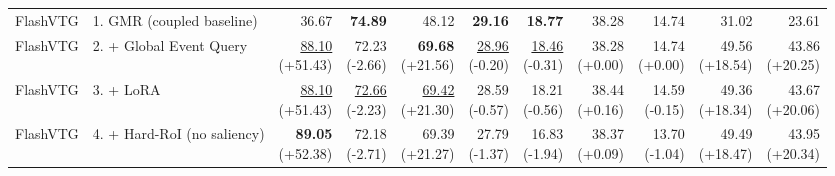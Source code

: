 \documentclass{article}
\begin{document}
{\begin{tabular}{llrrrrrrrrr}
\midrule
FlashVTG & 1. GMR (coupled baseline) & 36.67 & \textbf{74.89} & 48.12 & \textbf{29.16} & \textbf{18.77} & 38.28 & 14.74 & 31.02 & 23.61 \\
FlashVTG & 2. + Global Event Query & \shortstack{\underline{88.10} \\ {\scriptsize (+51.43)}} & \shortstack{72.23 \\ {\scriptsize (-2.66)}} & \shortstack{\textbf{69.68} \\ {\scriptsize (+21.56)}} & \shortstack{\underline{28.96} \\ {\scriptsize (-0.20)}} & \shortstack{\underline{18.46} \\ {\scriptsize (-0.31)}} & \shortstack{38.28 \\ {\scriptsize (+0.00)}} & \shortstack{14.74 \\ {\scriptsize (+0.00)}} & \shortstack{49.56 \\ {\scriptsize (+18.54)}} & \shortstack{43.86 \\ {\scriptsize (+20.25)}} \\
FlashVTG & 3. + LoRA & \shortstack{\underline{88.10} \\ {\scriptsize (+51.43)}} & \shortstack{\underline{72.66} \\ {\scriptsize (-2.23)}} & \shortstack{\underline{69.42} \\ {\scriptsize (+21.30)}} & \shortstack{28.59 \\ {\scriptsize (-0.57)}} & \shortstack{18.21 \\ {\scriptsize (-0.56)}} & \shortstack{38.44 \\ {\scriptsize (+0.16)}} & \shortstack{14.59 \\ {\scriptsize (-0.15)}} & \shortstack{49.36 \\ {\scriptsize (+18.34)}} & \shortstack{43.67 \\ {\scriptsize (+20.06)}} \\
FlashVTG & 4. + Hard-RoI (no saliency) & \shortstack{\textbf{89.05} \\ {\scriptsize (+52.38)}} & \shortstack{72.18 \\ {\scriptsize (-2.71)}} & \shortstack{69.39 \\ {\scriptsize (+21.27)}} & \shortstack{27.79 \\ {\scriptsize (-1.37)}} & \shortstack{16.83 \\ {\scriptsize (-1.94)}} & \shortstack{38.37 \\ {\scriptsize (+0.09)}} & \shortstack{13.70 \\ {\scriptsize (-1.04)}} & \shortstack{49.49 \\ {\scriptsize (+18.47)}} & \shortstack{43.95 \\ {\scriptsize (+20.34)}} \\

\end{tabular}}
\end{document}
